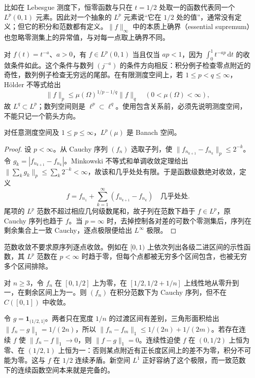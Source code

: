 比如在 Lebesgue 测度下，恒零函数与只在 $t=1/2$ 处取一的函数代表同一个 $L^p(0,1)$ 元素。因此对一个抽象的 $L^p$ 元素说“它在 $1/2$ 处的值”，通常没有定义；但它的积分和范数都有定义。$\|f\|_\infty$ 中的本质上确界（essential supremum）也忽略零测集上的异常值，与对每一点取上确界不同。

对 $f(t)=t^{-a}$、$a>0$，有 $f\in L^p(0,1)$ 当且仅当 $ap<1$，因为 $\int_0^1t^{-ap}\,\mathrm dt$ 的收敛条件如此。这个条件与数列 $(j^{-a})$ 的条件方向相反：积分例子检查零点附近的奇性，数列例子检查无穷远的尾部。在有限测度空间上，若 $1\leq p<q\leq\infty$，Hölder 不等式给出
\[
 \|f\|_p\leq\mu(\Omega)^{1/p-1/q}\|f\|_q
 \quad(0<\mu(\Omega)<\infty),
\]
故 $L^q\subset L^p$；数列空间则是 $\ell^p\subset\ell^q$。使用包含关系前，必须先说明测度空间，不能只记一个箭头方向。

\begin{theorem}\label{thm:fa-lp-complete}
对任意测度空间及 $1\leq p\leq\infty$，$L^p(\mu)$ 是 Banach 空间。
\end{theorem}
\begin{proof}
设 $p<\infty$。从 Cauchy 序列 $(f_n)$ 选取子列，使 $\|f_{n_{k+1}}-f_{n_k}\|_p\leq2^{-k}$。令 $g_k=|f_{n_{k+1}}-f_{n_k}|$。Minkowski 不等式和单调收敛定理给出 $\|\sum_kg_k\|_p\leq\sum_k2^{-k}<\infty$，故该和几乎处处有限。于是函数级数绝对收敛，定义
\[
 f=f_{n_1}+\sum_{k=1}^{\infty}(f_{n_{k+1}}-f_{n_k})
 \quad\text{几乎处处}.
\]
尾项的 $L^p$ 范数不超过相应几何级数尾和，故子列在范数下趋于 $f\in L^p$，原 Cauchy 序列也趋于 $f$。当 $p=\infty$ 时，去掉控制各对差的可数个零测集后，序列在剩余集合上一致 Cauchy，逐点极限便给出 $L^\infty$ 极限。
\end{proof}
范数收敛不要求原序列逐点收敛。例如在 $[0,1)$ 上依次列出各级二进区间的示性函数，其 $L^p$ 范数在 $p<\infty$ 时趋于零，但每个点都被无穷多个区间包含，也被无穷多个区间排除。

\begin{example}[为什么要从连续函数走向可积函数]\label{ex:fa-incomplete-integral}
对 $n\geq3$，令 $f_n$ 在 $[0,1/2]$ 上为零，在 $[1/2,1/2+1/n]$ 上线性地从零升到一，在剩余区间上为一。则 $(f_n)$ 在积分范数下为 Cauchy 序列，但不在 $C([0,1])$ 中收敛。
\end{example}
\begin{solve}
令 $g=\mathbf1_{(1/2,1]}$。两者只在宽度 $1/n$ 的过渡区间有差别，三角形面积给出 $\|f_n-g\|_1=1/(2n)$，所以 $\|f_n-f_m\|_1\leq1/(2n)+1/(2m)$。若存在连续 $f$ 使 $\|f_n-f\|_1\to0$，则 $\|f-g\|_1=0$。连续性迫使 $f$ 在 $(0,1/2)$ 上恒为零、在 $(1/2,1)$ 上恒为一：否则某点附近有正长度区间上的差不为零，积分不可能为零。这与 $f$ 在 $1/2$ 连续矛盾。新空间 $L^1$ 正好容纳了这个极限，而一致范数下的连续函数空间本来就是完备的。
\end{solve}

